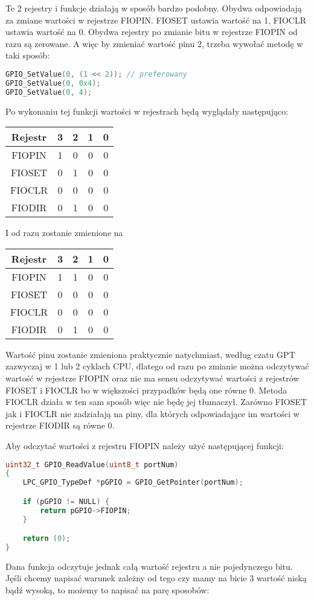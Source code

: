 \documentclass[11pt]{article}
\begin{document}
Te 2 rejestry i funkcje działają w sposób bardzo podobny. Obydwa odpowiadają za zmiane
wartości w rejestrze FIOPIN. FIOSET ustawia wartość na 1, FIOCLR ustawia wartość na 0.
Obydwa rejestry po zmianie bitu w rejestrze FIOPIN od razu są zerowane. A więc by zmieniać
wartość pinu 2, trzeba wywołać metodę w taki sposób:
\begin{lstlisting}[language=c]
GPIO_SetValue(0, (1 << 2)); // preferowany
GPIO_SetValue(0, 0x4);
GPIO_SetValue(0, 4);
\end{lstlisting}
Po wykonaniu tej funkcji wartości w rejestrach będą wyglądały następująco:
\begin{table}[H]
    \centering
    \begin{tabular}{|c|c|c|c|c|}
        \hline
        Rejestr & 3 & 2 & 1 & 0 \\ \hline
        FIOPIN & 1 & 0 & 0 & 0 \\ \hline
        FIOSET & 0 & 1 & 0 & 0 \\ \hline
        FIOCLR & 0 & 0 & 0 & 0 \\ \hline
        FIODIR & 0 & 1 & 0 & 0 \\ \hline
    \end{tabular}
\end{table}
I od razu zostanie zmienione na
\begin{table}[H]
    \centering
    \begin{tabular}{|c|c|c|c|c|}
        \hline
        Rejestr & 3 & 2 & 1 & 0 \\ \hline
        FIOPIN & 1 & 1 & 0 & 0 \\ \hline
        FIOSET & 0 & 0 & 0 & 0 \\ \hline
        FIOCLR & 0 & 0 & 0 & 0 \\ \hline
        FIODIR & 0 & 1 & 0 & 0 \\ \hline
    \end{tabular}
\end{table}
Wartość pinu zostanie zmieniona praktycznie natychmiast, według czatu GPT zazwyczaj w 1 lub 2
cyklach CPU, dlatego od razu po zmianie można odczytywać wartość w rejestrze FIOPIN oraz
nie ma sensu odczytywać wartości z rejestrów FIOSET i FIOCLR bo w większości przypadków
będą one równe 0. Metoda FIOCLR działa w ten sam sposób więc nie będę jej tłumaczył.
Zarówno FIOSET jak i FIOCLR nie zadziałają na piny, dla których odpowiadające im wartości
w rejestrze FIODIR są równe 0.

Aby odczytać wartości z rejestru FIOPIN należy użyć następującej funkcji:
\begin{lstlisting}[language=c]
uint32_t GPIO_ReadValue(uint8_t portNum)
{
	LPC_GPIO_TypeDef *pGPIO = GPIO_GetPointer(portNum);

	if (pGPIO != NULL) {
		return pGPIO->FIOPIN;
	}

	return (0);
}
\end{lstlisting}
\newpage
Dana funkcja odczytuje jednak całą wartość rejestru a nie pojedynczego bitu.
Jęśli chcemy napisać warunek zależny od tego czy mamy na bicie 3 wartość niską bądź
wysoką, to możemy to napisać na parę sposobów:
\end{document}
